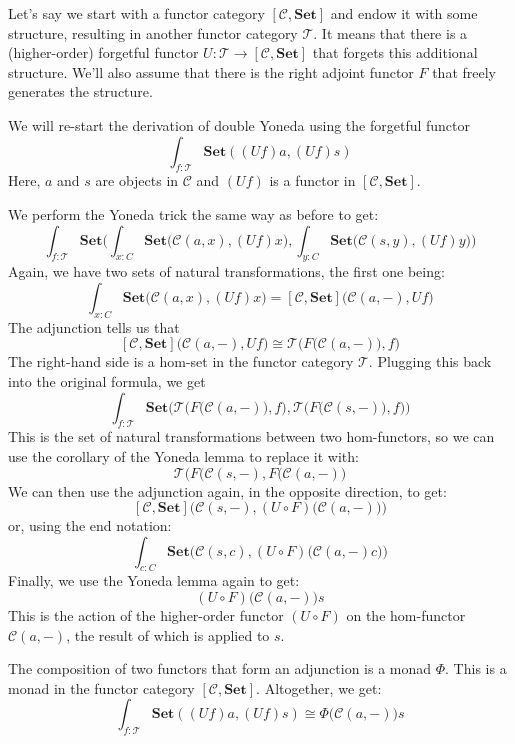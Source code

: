 \documentclass[11pt]{amsart}
\begin{document}
Let's say we start with a functor category $[\mathcal{C}, \mathbf{Set}]$ and endow it with some structure, resulting in another functor category $\mathcal{T}$. It means that there is a (higher-order) forgetful functor $U \colon \mathcal{T} \to [\mathcal{C}, \mathbf{Set}]$ that forgets this additional structure. We'll also assume that there is the right adjoint functor $F$ that freely generates the structure.

We will re-start the derivation of double Yoneda using the forgetful functor
\[ \int_{f \colon \mathcal{T}} \mathbf{Set}( (U f) a, (U f) s)\]
Here, $a$ and $s$ are objects in $\mathcal{C}$ and $(U f)$ is a functor in $[\mathcal{C}, \mathbf{Set}]$.

We perform the Yoneda trick the same way as before to get:
\[  \int_{f \colon \mathcal{T}}  \mathbf{Set}\Big(\int_{x \colon C} \mathbf{Set}\big(\mathcal{C}(a, x),(U f) x), \int_{y \colon C} \mathbf{Set}\big(\mathcal{C}(s, y),(U f) y\big)\Big)\]
Again, we have two sets of natural transformations, the first one being: 
\[\int_{x \colon C} \mathbf{Set}\big(\mathcal{C}(a, x), (U f) x\big) = [\mathcal{C}, \mathbf{Set}]\big(\mathcal{C}(a, -), U f\big)\]
The adjunction tells us that
\[ [\mathcal{C}, \mathbf{Set}]\big(\mathcal{C}(a, -), U f\big) \cong \mathcal{T}\Big(F\big(\mathcal{C}(a, -)\big), f\Big)\]
The right-hand side is a hom-set in the functor category $\mathcal{T}$. Plugging this back into the original formula, we get 
\[  \int_{f \colon \mathcal{T}}  \mathbf{Set}\Big(\mathcal{T}\Big(F\big(\mathcal{C}(a, -)\big), f\Big), \mathcal{T}\Big(F\big(\mathcal{C}(s, -)\big), f\Big) \Big)\]
This is the set of natural transformations between two hom-functors, so we can use the corollary of the Yoneda lemma to replace it with:
\[ \mathcal{T}\Big( F\big(\mathcal{C}(s, -), F\big(\mathcal{C}(a, -) \Big) \]
We can then use the adjunction again, in the opposite direction, to get:
\[  [\mathcal{C}, \mathbf{Set}] \Big( \mathcal{C}(s, -), (U \circ F)\big(\mathcal{C}(a, -)\big) \Big) \]
or, using the end notation:
\[ \int_{c \colon C} \mathbf{Set} \Big(\mathcal{C}(s, c), (U \circ F)\big(\mathcal{C}(a, -) c \big)\Big) \]
Finally, we use the Yoneda lemma again to get:
\[ (U \circ F) \big( \mathcal{C}(a, -) \big) s \]
This is the action of the higher-order functor $(U \circ F)$ on the hom-functor $\mathcal{C}(a, -)$, the result of which is applied to $s$.

The composition of two functors that form an adjunction is a monad $\Phi$. This is a monad in the functor category $[\mathcal{C}, \mathbf{Set}]$. Altogether, we get:
\[ \int_{f \colon \mathcal{T}} \mathbf{Set}( (U f) a, (U f) s) \cong \Phi \big( \mathcal{C}(a, -) \big) s \]
\end{document}
